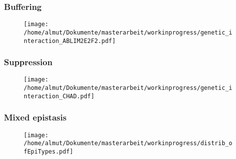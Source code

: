\documentclass[xcolor=dvipsnames,t,10pt]{beamer}
\begin{document}
%
%
\begin{frame}[c]
	\frametitle{Buffering}
	\begin{figure}
		\centering
		\texttt{[image: /home/almut/Dokumente/masterarbeit/workinprogress/genetic\_interaction\_ABLIM2E2F2.pdf]}
	\end{figure}
\end{frame}
%
\begin{frame}[c]
	\frametitle{Suppression}
	\begin{figure}
		\centering
		\texttt{[image: /home/almut/Dokumente/masterarbeit/workinprogress/genetic\_interaction\_CHAD.pdf]}
	\end{figure}
\end{frame}
%
%
\begin{frame}[c]
	\frametitle{Mixed epistasis}
	\begin{figure}
		\centering
		\texttt{[image: /home/almut/Dokumente/masterarbeit/workinprogress/distrib\_ofEpiTypes.pdf]}
	\end{figure}
\end{frame}
%
\end{document}
